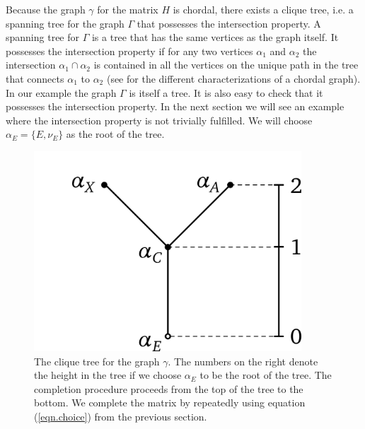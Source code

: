 \documentclass[11pt, a4paper]{article}
\begin{document}
Because the graph $\gamma$ for the matrix $H$ is chordal, there exists a clique tree, i.e.  a spanning tree for the graph $\Gamma$ that possesses the intersection property. A spanning tree for $\Gamma$ is a tree that has the same vertices as the graph itself. It possesses the intersection property if for any two vertices $\alpha_1$ and $\alpha_2$ the intersection $\alpha_1\cap\alpha_2$ is contained in all the vertices on the unique path in the tree that connects $\alpha_1$ to $\alpha_2$ (see \cite{blair} for the different characterizations of a chordal graph). In our example the graph $\Gamma$ is itself a tree. It is also easy to check that it possesses the intersection property. In the next section we will see an example where the intersection property is not trivially fulfilled. We will choose $\alpha_E = \{E, \nu_E\}$ as the root of the tree. 

\begin{figure}[hbt]
  \begin{center}
  	\includegraphics[width=10cm]{img/cliqueTree.png}
  \end{center}
  \caption{The clique tree for the graph $\gamma$. The numbers on the right denote the height in the tree if we choose $\alpha_E$ to be the root of the tree. The completion procedure proceeds from the top of the tree to the bottom. We complete the matrix by repeatedly using equation (\ref{eqn.choice}) from the previous section.}\label{fig.cliqueTree}
\end{figure}
\end{document}
